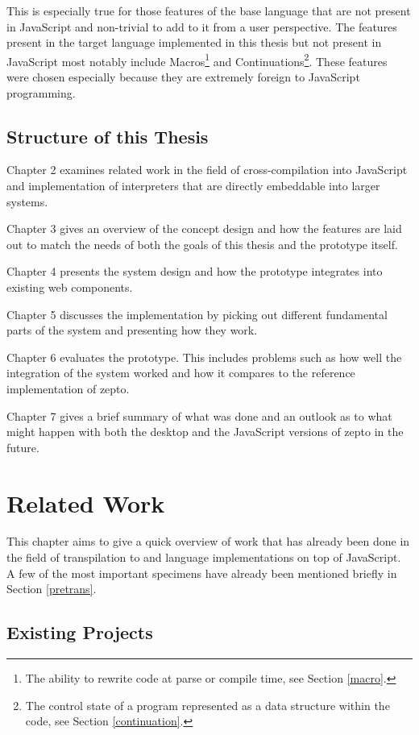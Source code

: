 \documentclass[oneside,11pt,xetex]{scrbook}
\begin{document}
This is especially true for those features of the base language that are not
present in JavaScript and non-trivial to add to it from a user perspective.
The features present in the target language implemented in this thesis but not
present in JavaScript most notably include Macros\footnote{The ability to rewrite
code at parse or compile time, see Section \ref{macro}.} and Continuations\footnote{The
control state of a program represented as a data structure within the code, see
Section \ref{continuation}.}. These features were chosen especially because they are
extremely foreign to JavaScript programming.

\section{Structure of this Thesis}

Chapter 2 examines related work in the field of cross-compilation into JavaScript and implementation
of interpreters that are directly embeddable into larger systems.

Chapter 3 gives an overview of the concept design and how the features are laid out to match the needs
of both the goals of this thesis and the prototype itself.

Chapter 4 presents the system design and how the prototype integrates into existing web components.

Chapter 5 discusses the implementation by picking out different fundamental parts of the system and
presenting how they work.

Chapter 6 evaluates the prototype. This includes problems such as how well the integration of the
system worked and how it compares to the reference implementation of zepto.

Chapter 7 gives a brief summary of what was done and an outlook as to what might happen with
both the desktop and the JavaScript versions of zepto in the future.

\chapter{Related Work}
\label{chap:RelatedWork}

This chapter aims to give a quick overview of work that has already been done in the
field of transpilation to and language implementations on top of JavaScript. A few
of the most important specimens have already been mentioned briefly in Section \ref{pretrans}.

\section{Existing Projects}
\end{document}
